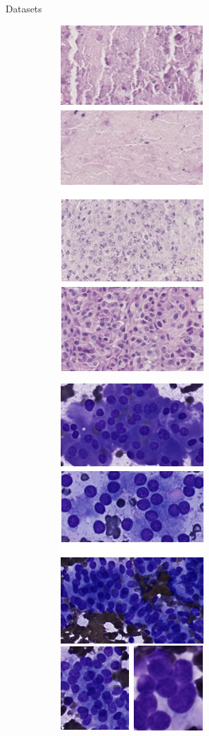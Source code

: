\documentclass{beamer}
\begin{document}
\begin{frame}{Datasets}
\begin{figure}
    \begin{subfigure}{0.1\textwidth}\includegraphics[scale=0.35]{images/illus_necrose.png}\end{subfigure}
    \begin{subfigure}{0.1\textwidth}\includegraphics[scale=0.35]{images/illus_patterns.png}\end{subfigure}

\end{figure}
\end{frame}
\end{document}
